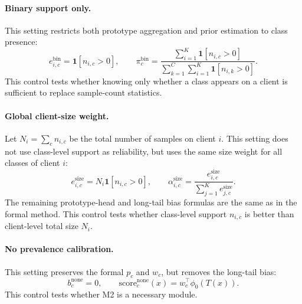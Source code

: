 \documentclass[letterpaper]{article}
\begin{document}
\paragraph{Binary support only.}
This setting restricts both prototype aggregation and prior estimation to class presence:
\begin{equation}
e_{i,c}^{\mathrm{bin}}=\mathbf{1}[n_{i,c}>0],
\qquad
\pi_c^{\mathrm{bin}}
=\frac{\sum_{i=1}^{K}\mathbf{1}[n_{i,c}>0]}
{\sum_{k=1}^{C}\sum_{i=1}^{K}\mathbf{1}[n_{i,k}>0]}.
\end{equation}
This control tests whether knowing only whether a class appears on a client is sufficient to replace sample-count statistics.

\paragraph{Global client-size weight.}
Let $N_i=\sum_c n_{i,c}$ be the total number of samples on client $i$. This setting does not use class-level support as reliability, but uses the same size weight for all classes of client $i$:
\begin{equation}
e_{i,c}^{\mathrm{size}}=N_i\mathbf{1}[n_{i,c}>0],
\qquad
\alpha_{i,c}^{\mathrm{size}}
=\frac{e_{i,c}^{\mathrm{size}}}{\sum_{j=1}^{K}e_{j,c}^{\mathrm{size}}}.
\end{equation}
The remaining prototype-head and long-tail bias formulas are the same as in the formal method. This control tests whether class-level support $n_{i,c}$ is better than client-level total size $N_i$.

\paragraph{No prevalence calibration.}
This setting preserves the formal $p_c$ and $w_c$, but removes the long-tail bias:
\begin{equation}
b_c^{\mathrm{none}}=0,
\qquad
\mathrm{score}_c^{\mathrm{none}}(x)=w_c^\top\phi_0(T(x)).
\end{equation}
This control tests whether M2 is a necessary module.
\end{document}
